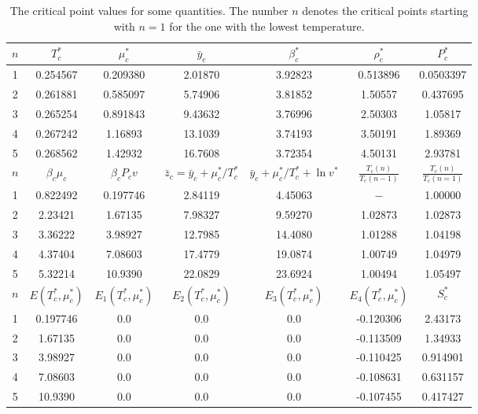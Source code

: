 \documentclass[12pt]{article}
\numberwithin{equation}{section}
\begin{document}
	\begin{table}[h]
		\centering
		\caption{The critical point values for some quantities. The number $n$ denotes the critical points starting with $n=1$ for the one with the lowest temperature.}
		\begin{tabular}{c|c|c|c|c|c|c|}
			\hline
			$n$ & $T^*_c$ & $\mu^*_c$ & $\bar{y}_c$ & $\beta^*_c$ & $\rho^*_c$ & $P^*_c$ \\
			\hline
			1 & 0.254567 & 0.209380 & 2.01870 & 3.92823 & 0.513896 & 0.0503397  \\
			2 & 0.261881 & 0.585097 & 5.74906 & 3.81852 & 1.50557 & 0.437695  \\
			3 & 0.265254 & 0.891843 & 9.43632 & 3.76996 & 2.50303 & 1.05817 \\
			4 & 0.267242 & 1.16893  & 13.1039 & 3.74193 & 3.50191 & 1.89369 \\
			5 & 0.268562 & 1.42932  & 16.7608 & 3.72354 & 4.50131 & 2.93781 \\
			\hline
			$n$ & $\beta_c\mu_c$ & $\beta_c P_c v$ & $\bar{z}_c=\bar{y}_c+\mu^*_c/T^*_c$ & $\bar{y}_c+\mu^*_c/T^*_c + \ln v^*$ & $\frac{T_c(n)}{T_c(n-1)}$ & $\frac{T_c(n)}{T_c(n=1)}$ \\
			\hline
			1 & 0.822492 & 0.197746 & 2.84119 & 4.45063 & $-$ & 1.00000 \\
			2 & 2.23421  & 1.67135  & 7.98327 & 9.59270 & 1.02873 & 1.02873 \\
			3 & 3.36222  & 3.98927  & 12.7985 & 14.4080 & 1.01288 & 1.04198 \\
			4 & 4.37404  & 7.08603 & 17.4779 & 19.0874 & 1.00749 & 1.04979 \\
			5 & 5.32214  & 10.9390 & 22.0829 & 23.6924 & 1.00494 & 1.05497 \\
			\hline
			$n$ & $E(T^*_c,\mu^*_c)$ & $E_1(T^*_c,\mu^*_c)$ & $E_2(T^*_c,\mu^*_c)$ & $E_3(T^*_c,\mu^*_c)$ & $E_4(T^*_c,\mu^*_c)$ & $S^*_c$  \\
			\hline
			1 & 0.197746 & 0.0 & 0.0 & 0.0 & -0.120306 & 2.43173 \\
			2 & 1.67135  & 0.0 & 0.0 & 0.0 & -0.113509 & 1.34933 \\
			3 & 3.98927  & 0.0 & 0.0 & 0.0 & -0.110425 & 0.914901 \\
			4 & 7.08603  & 0.0 & 0.0 & 0.0 & -0.108631 & 0.631157 \\
			5 & 10.9390  & 0.0 & 0.0 & 0.0 & -0.107455 & 0.417427 \\
			\hline
		\end{tabular}
		\label{tab:cp}
	\end{table}
	
\end{document}
